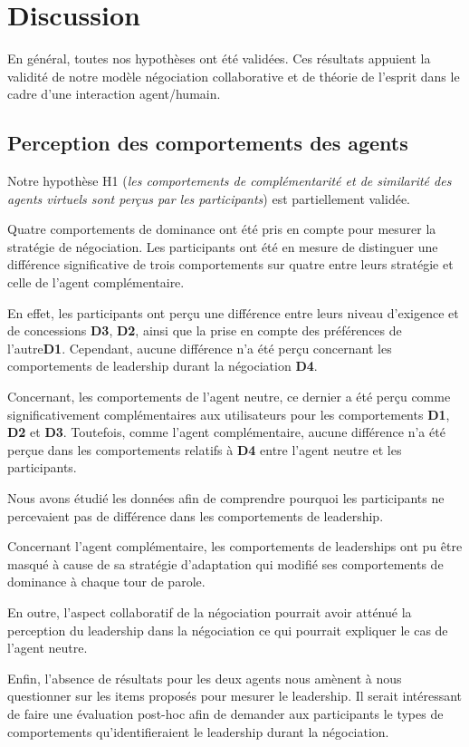 	\section{Discussion}
	\label{sec:discussion}
	En général, toutes nos hypothèses ont été validées. Ces résultats appuient la validité de notre modèle négociation collaborative et de théorie de l'esprit dans le cadre d'une interaction agent/humain.   
	
	\subsection{Perception des comportements des agents}
	Notre hypothèse H1 (\textit{les comportements de complémentarité et de similarité des agents virtuels sont perçus par les participants}) est partiellement validée. 
	
	Quatre comportements de dominance ont été pris en compte pour mesurer la stratégie de négociation. 
	Les participants ont été en mesure de distinguer une différence significative de trois comportements sur quatre entre leurs stratégie et celle de l'agent complémentaire.
	
	En effet, les participants ont perçu une différence entre leurs niveau d'exigence et de concessions \textbf{D3}, \textbf{D2}, ainsi que la prise en compte des préférences de l'autre\textbf{D1}. Cependant, aucune différence n'a été perçu concernant les comportements de leadership durant la négociation \textbf{D4}. 
	
	Concernant, les comportements de l'agent neutre, ce dernier a été perçu comme significativement complémentaires aux utilisateurs pour les comportements \textbf{D1}, \textbf{D2} et \textbf{D3}. 
	Toutefois, comme l'agent complémentaire, aucune différence n'a été perçue dans les comportements relatifs à \textbf{D4} entre l'agent neutre et les participants. 
	
	Nous avons étudié les données afin de comprendre pourquoi les participants ne percevaient pas de différence dans les comportements de leadership. 
	
	Concernant l'agent complémentaire, les comportements de leaderships ont pu être masqué à cause de  sa stratégie d'adaptation qui modifié ses comportements de dominance à chaque tour de parole.
	
	En outre, l'aspect collaboratif de la négociation pourrait avoir atténué la perception du leadership dans la négociation ce qui pourrait expliquer le cas de l'agent neutre. 
	
	Enfin, l'absence de résultats pour les deux agents nous amènent à nous questionner sur les items proposés pour mesurer le leadership. 
	Il serait intéressant de faire une évaluation post-hoc afin de demander aux participants le types de comportements qu'identifieraient le leadership durant la négociation.
	
